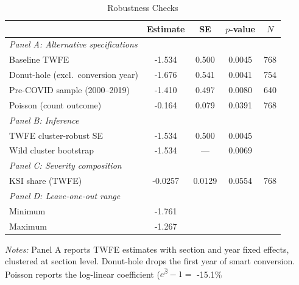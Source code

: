 \begin{table}[htbp]
\centering
\caption{Robustness Checks}
\label{tab:robustness}
\small
\begin{tabular}{lcccc}
\toprule
 & Estimate & SE & $p$-value & $N$ \\
\midrule
  \textit{Panel A: Alternative specifications} & & & & \\
  \quad Baseline TWFE & -1.534 & 0.500 & 0.0045 & 768 \\
  \quad Donut-hole (excl.\ conversion year) & -1.676 & 0.541 & 0.0041 & 754 \\
  \quad Pre-COVID sample (2000--2019) & -1.410 & 0.497 & 0.0080 & 640 \\
  \quad Poisson (count outcome) & -0.164 & 0.079 & 0.0391 & 768 \\
  \midrule
  \textit{Panel B: Inference} & & & & \\
  \quad TWFE cluster-robust SE & -1.534 & 0.500 & 0.0045 & \\
  \quad Wild cluster bootstrap & -1.534 & --- & 0.0069 & \\
  \midrule
  \textit{Panel C: Severity composition} & & & & \\
  \quad KSI share (TWFE) & -0.0257 & 0.0129 & 0.0554 & 768 \\
  \midrule
  \textit{Panel D: Leave-one-out range} & & & & \\
  \quad Minimum & -1.761 & & & \\
  \quad Maximum & -1.267 & & & \\
\bottomrule
\end{tabular}
\begin{tablenotes}
\item \textit{Notes:} Panel A reports TWFE estimates with section and year fixed effects, clustered at section level. Donut-hole drops the first year of smart conversion. Poisson reports the log-linear coefficient ($e^{\hat{\beta}} - 1 =$ -15.1\%%
\end{tablenotes}
\end{table}
